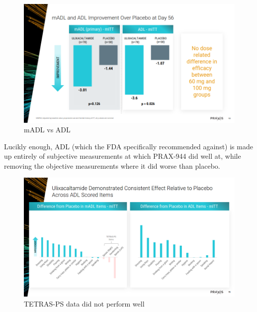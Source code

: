 \documentclass{article}
\begin{document}
        \begin{figure}[h]
                \centering
                \includegraphics[scale=0.4]{"Screenshot 2024-12-05 at 10-49-24 PowerPoint Presentation - Essential1 Topline Slides (IR Site).pdf.png"}
                \caption{mADL vs ADL}
        \end{figure}


        Lucikly enough, ADL (which the FDA specifically recommended against) is made up entirely of subjective measurements at which PRAX-944 did well at, while removing the objective measurements where it did worse than placebo.

        \begin{figure}[h]
                \centering
                \includegraphics[scale=0.3]{"Screenshot 2024-12-05 at 10-15-39 PowerPoint Presentation - Essential1 Topline Slides (IR Site).pdf.png"}
                \caption{TETRAS-PS data did not perform well}
        \end{figure}
\end{document}
